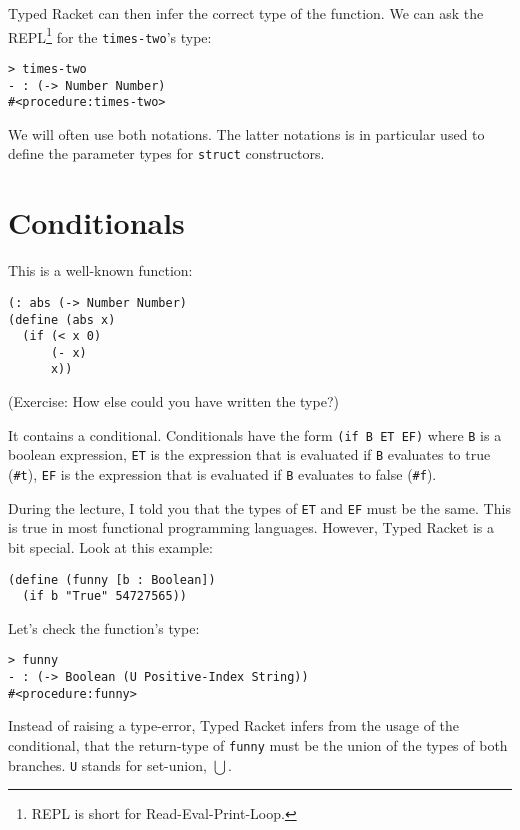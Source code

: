 \documentclass{article}
\begin{document}
Typed Racket can then infer the correct type of the function. We can ask the REPL\footnote{REPL is short for Read-Eval-Print-Loop.} for the \lstinline{times-two}'s type:

\begin{lstlisting}
> times-two
- : (-> Number Number)
#<procedure:times-two>
\end{lstlisting}

We will often use both notations. The latter notations is in particular used to define the parameter types for \lstinline{struct} constructors.

\section{Conditionals}

This is a well-known function:

\begin{lstlisting}
(: abs (-> Number Number)
(define (abs x)
  (if (< x 0)
      (- x)
      x))
\end{lstlisting}

(Exercise: How else could you have written the type?)

It contains a conditional. Conditionals have the form \lstinline{(if B ET EF)} where \lstinline{B} is a boolean expression, \lstinline{ET} is the expression that is evaluated if \lstinline{B} evaluates to true (\lstinline{#t}), \lstinline{EF} is the expression that is evaluated if \lstinline{B} evaluates to false (\lstinline{#f}).

During the lecture, I told you that the types of \lstinline{ET} and \lstinline{EF} must be the same. This is true in most functional programming languages. However, Typed Racket is a bit special. Look at this example:

\begin{lstlisting}
(define (funny [b : Boolean])
  (if b "True" 54727565))
\end{lstlisting}

Let's check the function's type:

\begin{lstlisting}
> funny
- : (-> Boolean (U Positive-Index String))
#<procedure:funny>
\end{lstlisting}

Instead of raising a type-error, Typed Racket infers from the usage of the conditional, that the return-type of \lstinline{funny} must be the union of the types of both branches. \lstinline{U} stands for set-union, $\bigcup$.
\end{document}
